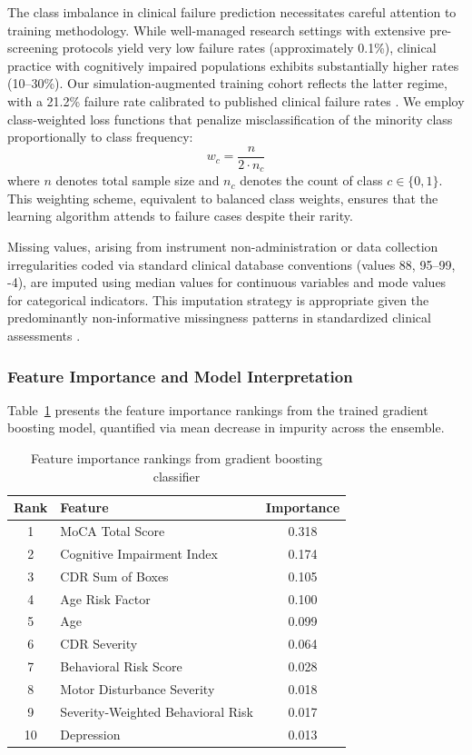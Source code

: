 \documentclass[11pt,a4paper]{article}
\begin{document}
The class imbalance in clinical failure prediction necessitates careful attention to training methodology. While well-managed research settings with extensive pre-screening protocols yield very low failure rates (approximately 0.1\%), clinical practice with cognitively impaired populations exhibits substantially higher rates (10--30\%). Our simulation-augmented training cohort reflects the latter regime, with a 21.2\% failure rate calibrated to published clinical failure rates \citep{porembka2025disparities}. We employ class-weighted loss functions that penalize misclassification of the minority class proportionally to class frequency:
\begin{equation}
w_c = \frac{n}{2 \cdot n_c}
\end{equation}
where $n$ denotes total sample size and $n_c$ denotes the count of class $c \in \{0, 1\}$. This weighting scheme, equivalent to balanced class weights, ensures that the learning algorithm attends to failure cases despite their rarity.

Missing values, arising from instrument non-administration or data collection irregularities coded via standard clinical database conventions (values 88, 95--99, -4), are imputed using median values for continuous variables and mode values for categorical indicators. This imputation strategy is appropriate given the predominantly non-informative missingness patterns in standardized clinical assessments \citep{sterne2009multiple}.

\subsubsection{Feature Importance and Model Interpretation}

Table~\ref{tab:feature_importance} presents the feature importance rankings from the trained gradient boosting model, quantified via mean decrease in impurity across the ensemble.

\begin{table}[htbp]
\centering
\caption{Feature importance rankings from gradient boosting classifier}
\label{tab:feature_importance}
\begin{tabular}{@{}clc@{}}
\toprule
\textbf{Rank} & \textbf{Feature} & \textbf{Importance} \\
\midrule
1 & MoCA Total Score & 0.318 \\
2 & Cognitive Impairment Index & 0.174 \\
3 & CDR Sum of Boxes & 0.105 \\
4 & Age Risk Factor & 0.100 \\
5 & Age & 0.099 \\
6 & CDR Severity & 0.064 \\
7 & Behavioral Risk Score & 0.028 \\
8 & Motor Disturbance Severity & 0.018 \\
9 & Severity-Weighted Behavioral Risk & 0.017 \\
10 & Depression & 0.013 \\
\bottomrule
\end{tabular}
\end{table}
\end{document}
